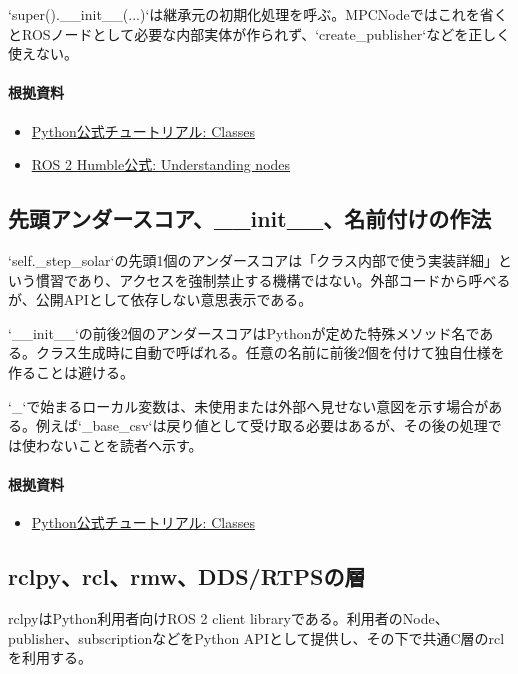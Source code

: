 \documentclass[a4paper,11pt]{article}
\begin{document}
`super().\_\_init\_\_(...)`は継承元の初期化処理を呼ぶ。MPCNodeではこれを省くとROSノードとして必要な内部実体が作られず、`create\_publisher`などを正しく使えない。

\paragraph{根拠資料}
\begin{itemize}[leftmargin=1.6em]
\item \href{https://docs.python.org/3/tutorial/classes.html}{Python公式チュートリアル: Classes}
\item \href{https://docs.ros.org/en/humble/Tutorials/Beginner-CLI-Tools/Understanding-ROS2-Nodes/Understanding-ROS2-Nodes.html}{ROS 2 Humble公式: Understanding nodes}
\end{itemize}

\subsection{先頭アンダースコア、\_\_init\_\_、名前付けの作法}
`self.\_step\_solar`の先頭1個のアンダースコアは「クラス内部で使う実装詳細」という慣習であり、アクセスを強制禁止する機構ではない。外部コードから呼べるが、公開APIとして依存しない意思表示である。


`\_\_init\_\_`の前後2個のアンダースコアはPythonが定めた特殊メソッド名である。クラス生成時に自動で呼ばれる。任意の名前に前後2個を付けて独自仕様を作ることは避ける。


`\_`で始まるローカル変数は、未使用または外部へ見せない意図を示す場合がある。例えば`\_base\_csv`は戻り値として受け取る必要はあるが、その後の処理では使わないことを読者へ示す。

\paragraph{根拠資料}
\begin{itemize}[leftmargin=1.6em]
\item \href{https://docs.python.org/3/tutorial/classes.html}{Python公式チュートリアル: Classes}
\end{itemize}

\subsection{rclpy、rcl、rmw、DDS/RTPSの層}
rclpyはPython利用者向けROS 2 client libraryである。利用者のNode、publisher、subscriptionなどをPython APIとして提供し、その下で共通C層のrclを利用する。
\end{document}
